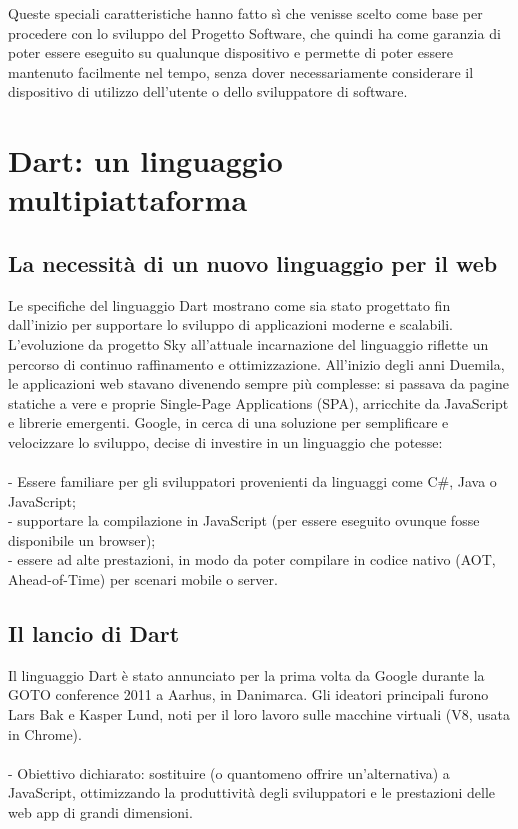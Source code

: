 \documentclass[14pt]{extbook}
\begin{document}
Queste speciali caratteristiche hanno fatto sì che venisse scelto come base per procedere con lo sviluppo del Progetto Software, che quindi ha come garanzia di poter essere eseguito su qualunque dispositivo e permette di poter essere mantenuto facilmente nel tempo, senza dover necessariamente considerare il dispositivo di utilizzo dell'utente o dello sviluppatore di software.\\
\pagebreak

\section{Dart: un linguaggio multipiattaforma}
\subsection{La necessità di un nuovo linguaggio per il web}
Le specifiche del linguaggio Dart \cite{dart2021spec} mostrano come sia stato progettato fin dall'inizio per supportare lo sviluppo di applicazioni moderne e scalabili. L'evoluzione da progetto Sky \cite{google2015sky} all'attuale incarnazione del linguaggio riflette un percorso di continuo raffinamento e ottimizzazione. All'inizio degli anni Duemila, le applicazioni web stavano divenendo sempre più complesse: si passava da pagine statiche a vere e proprie Single-Page Applications (SPA), arricchite da JavaScript e librerie emergenti. Google, in cerca di una soluzione per semplificare e velocizzare lo sviluppo, decise di investire in un linguaggio che potesse:\\\\
- Essere familiare per gli sviluppatori provenienti da linguaggi come C\#, Java o JavaScript;\\
- supportare la compilazione in JavaScript (per essere eseguito ovunque fosse disponibile un browser);\\
- essere ad alte prestazioni, in modo da poter compilare in codice nativo (AOT, Ahead-of-Time) per scenari mobile o server.\\

\subsection{Il lancio di Dart}
Il linguaggio Dart è stato annunciato per la prima volta da Google durante la GOTO conference 2011 a Aarhus, in Danimarca. Gli ideatori principali furono Lars Bak e Kasper Lund, noti per il loro lavoro sulle macchine virtuali (V8, usata in Chrome).\\\\
- Obiettivo dichiarato: sostituire (o quantomeno offrire un’alternativa) a JavaScript, ottimizzando la produttività degli sviluppatori e le prestazioni delle web app di grandi dimensioni.\\
\pagebreak
\end{document}
